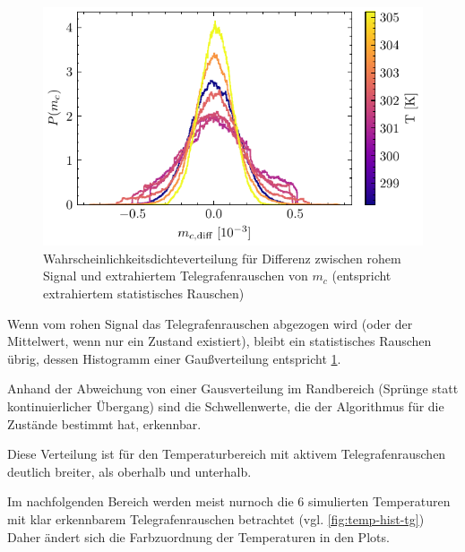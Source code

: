 \documentclass[main.tex]{subfiles}
\begin{document}
\begin{figure}[H]
    \centering
    \includegraphics{bilder/plots/temp_comparison_long/mc_diff_hist.pdf}
    \caption{Wahrscheinlichkeitsdichteverteilung für Differenz zwischen rohem Signal und extrahiertem Telegrafenrauschen von \(m_c\) (entspricht extrahiertem statistisches Rauschen)}\label{fig:temp-diff-hist}    
\end{figure}

Wenn vom rohen Signal das Telegrafenrauschen abgezogen wird (oder der Mittelwert, wenn nur ein Zustand existiert), bleibt ein statistisches Rauschen übrig, dessen Histogramm einer Gaußverteilung entspricht \cref{fig:temp-diff-hist}. 

Anhand der Abweichung von einer Gausverteilung im Randbereich (Sprünge statt kontinuierlicher Übergang) sind die Schwellenwerte, die der Algorithmus für die Zustände bestimmt hat, erkennbar.

Diese Verteilung ist für den Temperaturbereich mit aktivem Telegrafenrauschen deutlich breiter, als oberhalb und unterhalb. 

Im nachfolgenden Bereich werden meist nurnoch die 6 simulierten Temperaturen mit klar erkennbarem Telegrafenrauschen betrachtet (vgl. \cref{fig:temp-hist-tg}) Daher ändert sich die Farbzuordnung der Temperaturen in den Plots.
\end{document}
